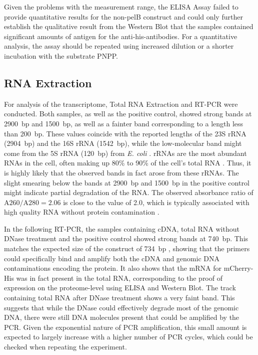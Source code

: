 \documentclass[a4paper,12pt]{article}
\begin{document}
Given the problems with the measurement range, the ELISA Assay failed to provide quantitative results for the non-pelB construct and could only further establish the qualitative result from the Western Blot that the samples contained significant amounts of antigen for the anti-his-antibodies. For a quantitative analysis, the assay should be repeated using increased dilution or a shorter incubation with the substrate PNPP.

\subsection{RNA Extraction}
For analysis of the transcriptome, Total RNA Extraction and RT-PCR were conducted. Both samples, as well as the positive control, showed strong bands at 2900~bp and 1500~bp, as well as a fainter band corresponding to a length less than 200~bp. These values coincide with the reported lengths of the 23S rRNA (2904~bp) and the 16S rRNA (1542~bp), while the low-molecular band might come from the 5S rRNA (120~bp) from \emph{E. coli} \cite{Kaczanowska2007}. rRNAs are the most abundant RNAs in the cell, often making up 80\% to 90\% of the cell's total RNA \cite{Munafo2016}. Thus, it is highly likely that the observed bands in fact arose from these rRNAs. The slight smearing below the bands at 2900~bp and 1500~bp in the positive control might indicate partial degradation of the RNA. The observed absorbance ratio of $\text{A260}/\text{A280}=2.06$ is close to the value of 2.0, which is typically associated with high quality RNA without protein contamination \cite{poovakka2018quality}. 

In the following RT-PCR, the samples containing cDNA, total RNA without DNase treatment and the positive control showed strong bands at 740~bp. This matches the expected size of the construct of 734~bp \cite{Schillberg2025}, showing that the primers could specifically bind and amplify both the cDNA and genomic DNA contaminations encoding the protein. It also shows that the mRNA for mCherry-His was in fact present in the total RNA, corresponding to the proof of expression on the proteome-level using ELISA and Western Blot. The track containing total RNA after DNase treatment shows a very faint band. This suggests that while the DNase could effectively degrade most of the genomic DNA, there were still DNA molecules present that could be amplified by the PCR. Given the exponential nature of PCR amplification, this small amount is expected to largely increase with a higher number of PCR cycles, which could be checked when repeating the experiment.
\end{document}
